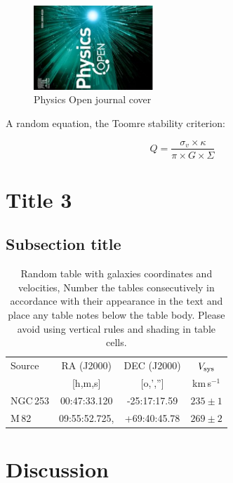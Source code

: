\documentclass[final,5p,times,twocolumn,authoryear]{elsarticle}
\newcommand{\kms}{km\,s$^{-1}$}
\begin{document}
\begin{figure}
	\centering 
	\includegraphics[width=0.4\textwidth, angle=-90]{PHYSO_cover_image.pdf}	
	\caption{Physics Open journal cover} 
	\label{fig_mom0}%
\end{figure}

A random equation, the Toomre stability criterion:

\begin{equation}
    Q = \frac{\sigma_v \times \kappa}{\pi \times G \times \Sigma}
\end{equation}

\section{Title 3}
\lipsum[2]

\subsection{Subsection title}
\lipsum[3]

\begin{table}
\begin{tabular}{l c c c} 
 \hline
 Source & RA (J2000) & DEC (J2000) & $V_{\rm sys}$ \\ 
        & [h,m,s]    & [o,','']    & \kms          \\
 \hline
 NGC\,253 & 	00:47:33.120 & -25:17:17.59 & $235 \pm 1$ \\ 
 M\,82 & 09:55:52.725, & +69:40:45.78 & $269 \pm 2$ 	 \\ 
 \hline
\end{tabular}
\caption{Random table with galaxies coordinates and velocities, Number the tables consecutively in
accordance with their appearance in the text and place any table notes below the table body. Please avoid using vertical rules and shading in table cells.
}
\label{Table1}
\end{table}


\section{Discussion}
\lipsum[4]
\end{document}
